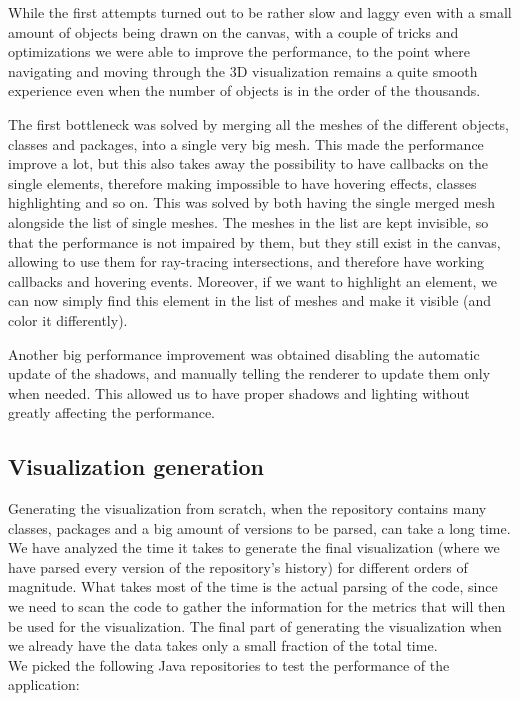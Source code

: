 \documentclass[]{usiinfbachelorproject}
\begin{document}
While the first attempts turned out to be rather slow and laggy even with a small amount of objects being drawn on the canvas, with a couple of tricks and optimizations we were able to improve the performance, to the point where navigating and moving through the 3D visualization remains a quite smooth experience even when the number of objects is in the order of the thousands.

The first bottleneck was solved by merging all the meshes of the different objects, classes and packages, into a single very big mesh. This made the performance improve a lot, but this also takes away the possibility to have callbacks on the single elements, therefore making impossible to have hovering effects, classes highlighting and so on. This was solved by both having the single merged mesh alongside the list of single meshes. The meshes in the list are kept invisible, so that the performance is not impaired by them, but they still exist in the canvas, allowing to use them for ray-tracing intersections, and therefore have working callbacks and hovering events. Moreover, if we want to highlight an element, we can now simply find this element in the list of meshes and make it visible (and color it differently).

Another big performance improvement was obtained disabling the automatic update of the shadows, and manually telling the renderer to update them only when needed. This allowed us to have proper shadows and lighting without greatly affecting the performance.

\subsection{Visualization generation} \label{Visualization generation}

Generating the visualization from scratch, when the repository contains many classes, packages and a big amount of versions to be parsed, can take a long time. We have analyzed the time it takes to generate the final visualization (where we have parsed every version of the repository's history) for different orders of magnitude. What takes most of the time is the actual parsing of the code, since we need to scan the code to gather the information for the metrics that will then be used for the visualization. The final part of generating the visualization when we already have the data takes only a small fraction of the total time.\\

We picked the following Java repositories to test the performance of the application:
\end{document}
